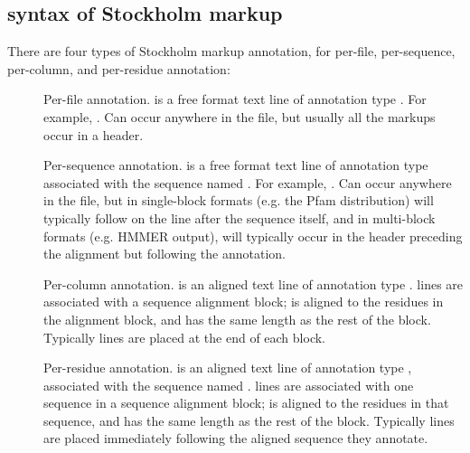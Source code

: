 \subsection{syntax of Stockholm markup}

There are four types of Stockholm markup annotation, for per-file,
per-sequence, per-column, and per-residue annotation:

\begin{description}%
\item []
        Per-file annotation.  is a free format text line
        of annotation type . For example, . Can occur anywhere in the file, but usually
        all the  markups occur in a header.

\item []
        Per-sequence annotation.  is a free format text line
        of annotation type  associated with the sequence
        named . For example, . Can occur anywhere
        in the file, but in single-block formats (e.g. the Pfam
        distribution) will typically follow on the line after the
        sequence itself, and in multi-block formats (e.g. HMMER
        output), will typically occur in the header preceding the
        alignment but following the  annotation.

\item []
        Per-column annotation.  is an aligned text line
        of annotation type .
         lines are
        associated with a sequence alignment block; 
        is aligned to the residues in the alignment block, and has
        the same length as the rest of the block.
        Typically  lines are placed at the end of each block.

\item []
        Per-residue annotation.  is an aligned text line
        of annotation type , associated with the sequence
        named . 
         lines are 
        associated with one sequence in a sequence alignment block; 
        is aligned to the residues in that sequence, and has
        the same length as the rest of the block.
        Typically
         lines are placed immediately following the
        aligned sequence they annotate.
\end{description}


